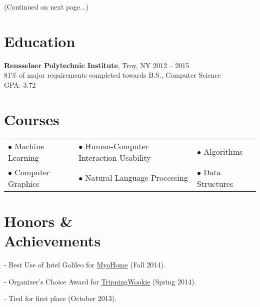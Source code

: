 \documentclass[margin]{res}
\begin{document}
\vfill \hfill (Continued on next page...)

\begin{minipage}{\textwidth}
\begin{resume}

\section{Education}
{\bf Rensselaer Polytechnic Institute}, Troy, NY \hfill 2012 -- 2015 \\
81\% of major requirements completed towards B.S., Computer Science \\
GPA: 3.72

\section{Courses}
\begin{tabular}{lll}
$\bullet$ Machine Learning & $\bullet$ Human-Computer Interaction Usability & $\bullet$ Algorithms \\
$\bullet$ Computer Graphics & $\bullet$ Natural Language Processing & $\bullet$ Data Structures \\
\end{tabular}

 \section{Honors \& \\ Achievements}
\begin{description} \itemsep -11pt
		\item[YHack] - Best Use of Intel Galileo for \uline{\href{http://GitHub.com/VoidingWarranties/Myo-Home}{MyoHome}} (Fall 2014). \\
		\item[HackRU] - Organizer's Choice Award for \uline{\href{http://GitHub.com/VoidingWarranties/TrippingWookie}{TrippingWookie}} (Spring 2014). \\
		\item[Microsoft Coding Competition] - Tied for first place (October 2013). \\
		\item[Rensselaer Leadership Award]
\end{description}

\end{resume}
\end{minipage}
\end{document}
